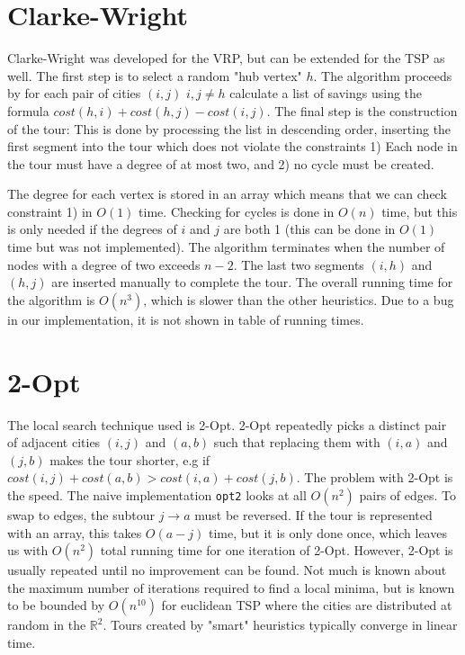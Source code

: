 \documentclass{report}
\begin{document}
\section{Clarke-Wright}
Clarke-Wright was developed for the VRP, but can be extended for the TSP as well. The first step is to select a random "hub vertex" $h$. The algorithm proceeds by for each pair of cities $(i, j)$ $i, j \neq h$ calculate a list of savings using the formula $cost(h, i) + cost(h, j) - cost(i, j)$. The final step is the construction of the tour: This is done by processing the list in descending order, inserting the first segment into the tour which does not violate the constraints 1) Each node in the tour must have a degree of at most two, and 2) no cycle must be created. 

The degree for each vertex is stored in an array which means that we can check constraint 1) in $O(1)$ time. Checking for cycles is done in $O(n)$ time, but this is only needed if the degrees of $i$ and $j$ are both 1 (this can be done in $O(1)$ time but was not implemented). The algorithm terminates when the number of nodes with a degree of two exceeds $n-2$. The last two segments $(i, h)$ and $(h, j)$ are inserted manually to complete the tour. The overall running time for the algorithm is $O(n^3)$, which is slower than the other heuristics. Due to a bug in our implementation, it is not shown in table of running times.

\section{2-Opt}
The local search technique used is 2-Opt. 2-Opt repeatedly picks a distinct pair of adjacent cities $(i,j)$ and $(a, b)$ such that replacing them with $(i, a)$ and $(j, b)$ makes the tour shorter, e.g if $cost(i, j) + cost(a,b) > cost(i,a) + cost(j, b)$. The problem with 2-Opt is the speed. The naive implementation \verb!opt2! looks at all $O(n^2)$ pairs of edges. To swap to edges, the subtour $j \rightarrow a$ must be reversed. If the tour is represented with an array, this takes $O(a-j)$ time, but it is only done once, which leaves us with $O(n^2)$ total running time for one iteration of 2-Opt. However, 2-Opt is usually repeated until no improvement can be found. Not much is known about the maximum number of iterations required to find a local minima, but is known to be bounded by $O(n^{10})$ for euclidean TSP where the cities are distributed at random in the $\mathbb{R}^2$.\cite{englert2006} Tours created by "smart" heuristics typically converge in linear time.
\end{document}
